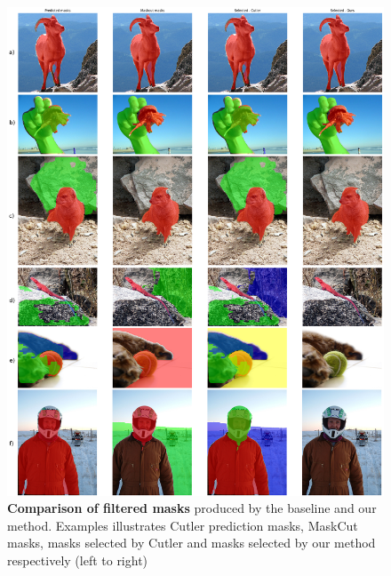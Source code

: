 \begin{figure}
	\centering
	\includegraphics[width=1\textwidth]{Images/main/filtered_mask_comparison.png}
	\caption[\textbf{Mask Filtration Outputs - Baseline vs Ours}]{\textbf{Comparison of filtered masks} produced by the baseline and our method. Examples illustrates Cutler prediction masks, MaskCut masks, masks selected by Cutler and masks selected by our method respectively (left to right)}
	\label{fig:filtered_mask_comparison}
\end{figure}
